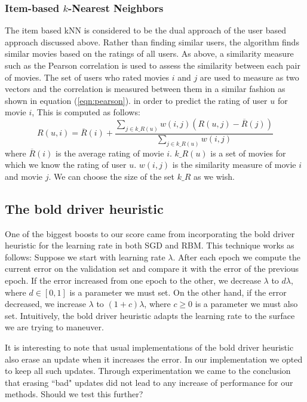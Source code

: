 \documentclass[10pt,conference,compsocconf]{IEEEtran}
\begin{document}
\subsubsection*{\textbf{Item-based $k$-Nearest Neighbors}}  The item based kNN is considered to be the dual approach of the user based approach discussed above. Rather than finding similar users, the algorithm finds similar movies based on the ratings of all users. As above, a similarity measure such as the Pearson correlation is used to assess the similarity between each pair of movies. The set of users who rated movies $i$ and $j$ are used to measure as two vectors and the correlation is measured between them in a similar fashion as shown in equation (\ref{eqn:pearson}). in order to predict the rating of user $u$ for movie $i$, This is computed as follows:
\begin{equation}
R(u,i) = \overline{R}(i) + \frac{\sum_{j \in k\_R(u)} w(i,j)(R(u,j) - \overline{R}(j))}{\sum_{j \in k\_R(u)} w(i,j)}
\end{equation}
where $\overline{R}(i)$ is the average rating of movie $i$. $k\_R(u)$ is a set of movies for which we know the rating of user $u$. $w(i,j)$ is the similarity measure of movie $i$ and movie $j$. We can choose the size of the set $k\_R$ as we wish. 

\subsection{The bold driver heuristic} 
One of the biggest boosts to our score came from incorporating the bold driver heuristic for the learning rate in both SGD and RBM. This technique works as follows: Suppose we start with learning rate $\lambda$. After each epoch we compute the current error on the validation set and compare it with the error of the previous epoch. If the error increased from one epoch to the other, we decrease $\lambda$ to $d\lambda$, where $d\in[0,1]$ is a parameter we must set. On the other hand, if the error decreased, we increase $\lambda$ to $(1+c)\lambda$, where $c\geq 0$ is a parameter we must also set. Intuitively, the bold driver heuristic adapts the learning rate to the surface we are trying to maneuver.

It is interesting to note that usual implementations of the bold driver heuristic also erase an update when it increases the error. In our implementation we opted to keep all such updates. Through experimentation we came to the conclusion that erasing ``bad" updates did not lead to any increase of performance for our methods. {\color{red} Should we test this further?}
\end{document}
